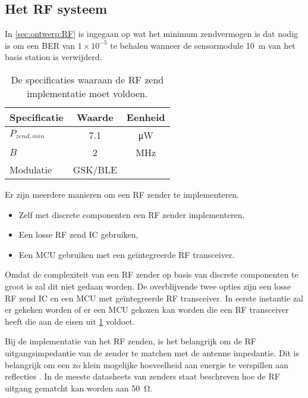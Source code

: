 \subsection{Het RF systeem}
In \cref{sec:ontwerp:RF} is ingegaan op wat het minimum zendvermogen is dat nodig is om een BER van $1\times 10^{-5}$ te behalen wanneer de \si{\pH} sensormodule \qty{10}{\meter} van het basis station is verwijderd.
\begin{table}[!htb]
    \centering
    \begin{tabular}{l|c|c}
        Specificatie    & Waarde    & Eenheid \\\hline
        $P_{zend,min}$  & 7.1       & \si{\micro\watt}  \\
        $B$             & 2         & \si{\mega\hertz}  \\
        Modulatie       & GSK/BLE   &                   \\
    \end{tabular}
    \caption{De specificaties waaraan de RF zend implementatie moet voldoen.}
    \label{tab:specRfsending}
\end{table}

Er zijn meerdere manieren om een RF zender te implementeren.
\begin{itemize}
    \item Zelf met discrete componenten een RF zender implementeren,
    \item Een losse RF zend IC gebruiken,
    \item Een MCU gebruiken met een geïntegreerde RF transceiver.
\end{itemize}
Omdat de complexiteit van een RF zender op basis van discrete componenten te groot is zal dit niet gedaan worden. De overblijvende twee opties zijn een losse RF zend IC en een MCU met geïntegreerde RF transceiver. In eerste instantie zal er gekeken worden of er een MCU gekozen kan worden die een RF transceiver heeft die aan de eisen uit \cref{tab:specRfsending} voldoet.

Bij de implementatie van het RF zenden, is het belangrijk om de RF uitgangsimpedantie van de zender te matchen met de antenne impedantie. Dit is belangrijk om een zo klein mogelijke hoeveelheid aan energie te verspillen aan reflecties \cite{FundamentalsofAppliedElectromagnetics}. In de meeste datasheets van zenders staat beschreven hoe de RF uitgang gematcht kan worden aan \qty{50}{\ohm}.